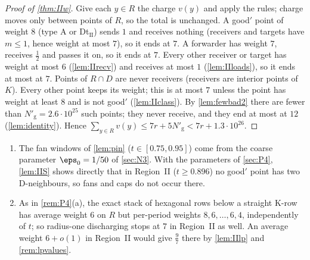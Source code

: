 \begin{proof}[Proof of \cref{thm:IIw}]
Give each $y\in R$ the charge $v(y)$ and apply the rules; charge moves only between points of $R$, so the total is unchanged. A good$'$ point of weight $8$ (type A or Dt$_{\mathrm{II}}$) sends $1$ and receives nothing (receivers and targets have $m\le1$, hence weight at most $7$), so it ends at $7$. A forwarder has weight $7$, receives $\frac12$ and passes it on, so it ends at $7$. Every other receiver or target has weight at most $6$ (\cref{lem:IIrecv}) and receives at most $1$ (\cref{lem:IIloads}), so it ends at most at $7$. Points of $R\cap D$ are never receivers (receivers are interior points of $K$). Every other point keeps its weight; this is at most $7$ unless the point has weight at least $8$ and is not good$'$ (\cref{lem:IIclass}). By \cref{lem:fewbad2} there are fewer than $N'_{\mathrm g}=2.6\cdot10^{25}$ such points; they never receive, and they end at most at $12$ (\cref{lem:identity}). Hence $\sum_{y\in R}v(y)\le7r+5N'_{\mathrm g}<7r+1.3\cdot10^{26}$.
\end{proof}

\begin{remark}\label{rem:IIw}
\begin{enumerate}[leftmargin=2em,label=(\alph*)]
\item The fan windows of \cref{lem:pin} ($t\in[0.75,0.95]$) come from the coarse parameter $\eps_0=1/50$ of \cref{sec:N3}. With the parameters of \cref{sec:P4}, \cref{lem:IIS} shows directly that in Region~II ($t\ge0.896$) no good$'$ point has two D-neighbours, so fans and caps do not occur there.
\item As in \cref{rem:P4}(a), the exact stack of hexagonal rows below a straight K-row has average weight $6$ on $R$ but per-period weights $8,6,\dots,6,4$, independently of $t$; so radius-one discharging stops at $7$ in Region~II as well. An average weight $6+o(1)$ in Region~II would give $\frac97$ there by \cref{lem:IIlp} and \cref{rem:lpvalues}.
\end{enumerate}
\end{remark}

